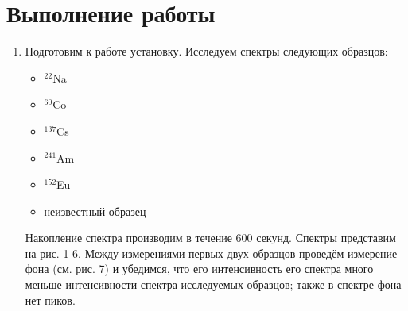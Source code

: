 \documentclass[a4paper]{article}
\begin{document}
\section{Выполнение работы}

\begin{enumerate}

    \item Подготовим к работе установку. Исследуем спектры следующих образцов:
    \begin{itemize}
        \item $^{22}$Na
        \item $^{60}$Co
        \item $^{137}$Cs
        \item $^{241}$Am
        \item $^{152}$Eu
        \item неизвестный образец
    \end{itemize}
    Накопление спектра производим в течение 600 секунд. Спектры представим на рис. 1-6. Между измерениями первых двух образцов проведём измерение фона (см. рис. 7) и убедимся, что его интенсивность его спектра много меньше интенсивности спектра исследуемых образцов; также в спектре фона нет пиков.
    
    \clearpage 
    

\end{enumerate}
\end{document}
